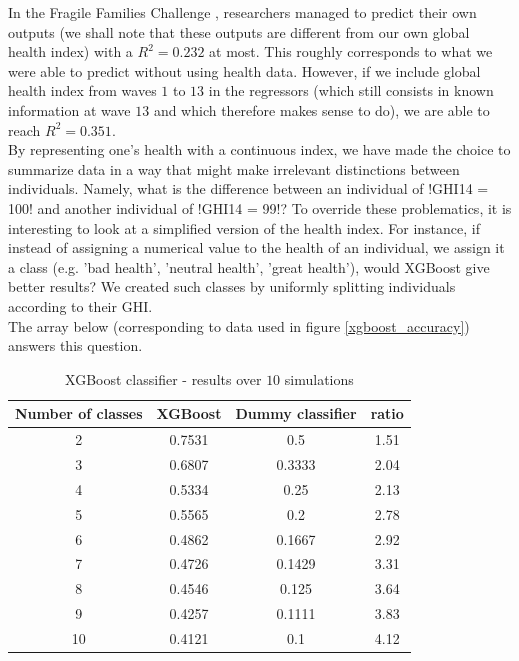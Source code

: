 \documentclass[]{article}
\begin{document}
\noindent
In the Fragile Families Challenge \cite{challenge2017}, researchers managed to predict their own outputs (we shall note that these outputs are different from our own global health index) with a $R^2 = 0.232$ at most. This roughly corresponds to what we were able to predict without using health data. However, if we include global health index from waves $1$ to $13$ in the regressors (which still consists in known information at wave $13$ and which therefore makes sense to do), we are able to reach $R^2=0.351$.\\

\noindent
By representing one's health with a continuous index, we have made the choice to summarize data in a way that might make irrelevant distinctions between individuals. Namely, what is the difference between an individual of \pyth!GHI14 = 100! and another individual of \pyth!GHI14 = 99!? To override these problematics, it is interesting to look at a simplified version of the health index. For instance, if instead of assigning a numerical value to the health of an individual, we assign it a class (e.g. 'bad health', 'neutral health', 'great health'), would XGBoost give better results? We created such classes by uniformly splitting individuals according to their GHI.\\
The array below (corresponding to data used in figure \ref{xgboost_accuracy})  answers this question.\\
\begin{table}[!h]
	\centering
	\begin{tabular}{|c|c|c|c|}
		\hline
		
		\textbf{Number of classes} & \textbf{XGBoost} & \textbf{Dummy classifier} & \textbf{ratio}\\
		\hline
		2 & 0.7531 & 0.5 & 1.51\\
		\hline 
		3 & 0.6807 & 0.3333 & 2.04\\
		\hline 
		4 & 0.5334 & 0.25 & 2.13\\
		\hline 
		5 & 0.5565 & 0.2 & 2.78\\
		\hline 
		6 & 0.4862 & 0.1667 & 2.92\\
		\hline 
		7 & 0.4726 & 0.1429 & 3.31\\
		\hline 
		8 & 0.4546 & 0.125 & 3.64\\
		\hline 
		9 & 0.4257 & 0.1111 & 3.83\\
		\hline 
		10 & 0.4121 & 0.1 & 4.12\\
		\hline 
	\end{tabular}
	\label{results_xgbclassifier}
	\caption{XGBoost classifier - results over $10$ simulations}
\end{table}\\
\end{document}
